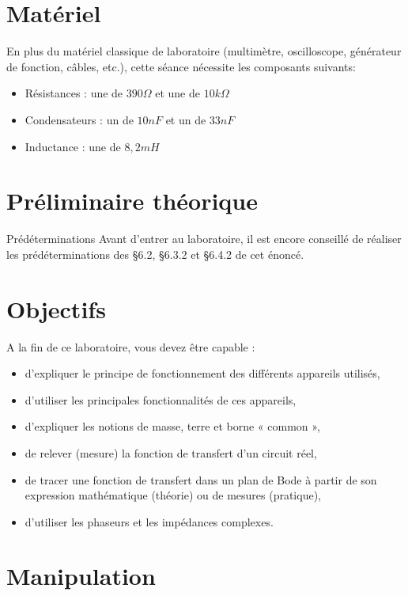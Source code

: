 \documentclass{../template/tp}
\begin{document}
\section{Matériel}
En plus du matériel classique de laboratoire (multimètre, oscilloscope, générateur de fonction, câbles, etc.), cette séance nécessite les composants suivants:
\begin{itemize}
\item Résistances : une de $390\Omega$ et une de $10k\Omega$
\item Condensateurs : un de $10nF$ et un de $33nF$
\item Inductance : une de $8,2mH$
\end{itemize}

\newpage
\section{Préliminaire théorique} %
Prédéterminations
Avant d'entrer au laboratoire, il est encore conseillé de réaliser les prédéterminations des §6.2, §6.3.2 et §6.4.2 de cet énoncé.

\section{Objectifs}
A la fin de ce laboratoire, vous devez être capable :
\begin{itemize}
\item d'expliquer le principe de fonctionnement des différents appareils utilisés,
\item d'utiliser les principales fonctionnalités de ces appareils,
\item d'expliquer les notions de masse, terre et borne « common »,
\item de relever (mesure) la fonction de transfert d'un circuit réel,
\item de tracer une fonction de transfert dans un plan de Bode à partir de son expression mathématique (théorie) ou de
mesures (pratique),
\item d'utiliser les phaseurs et les impédances complexes.
\end{itemize}



\section{Manipulation}
\end{document}
